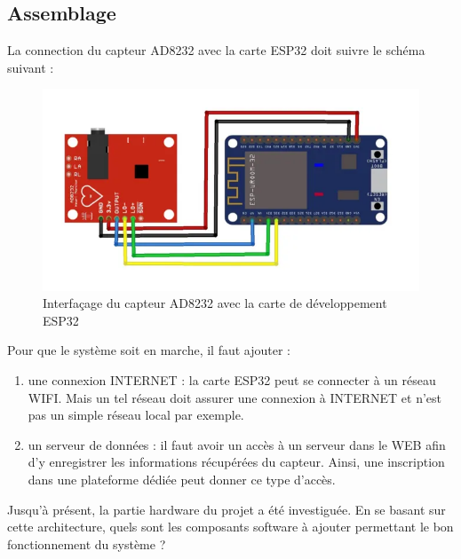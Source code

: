 \subsection{Assemblage}
La connection du capteur AD8232 avec la carte ESP32 doit suivre le schéma suivant :

\begin{figure}[H]
  \centering
  \includegraphics[scale=.4]{imgs/AD8232ESP32.png}
  \caption{Interfaçage du capteur AD8232 avec la carte de développement ESP32}
\end{figure}

Pour que le système soit en marche, il faut ajouter :
\begin{enumerate}
  \item une connexion INTERNET : la carte ESP32 peut se connecter à un réseau WIFI. Mais un tel réseau doit assurer une connexion à INTERNET et n'est pas un simple réseau local par exemple.
  \item un serveur de données : il faut avoir un accès à un serveur dans le WEB afin d'y enregistrer les informations récupérées du capteur. Ainsi, une inscription dans une plateforme dédiée peut donner ce type d'accès.
\end{enumerate}

Jusqu'à présent, la partie hardware du projet a été investiguée. En se basant sur cette architecture, quels sont les composants software à ajouter permettant le bon fonctionnement du système ?